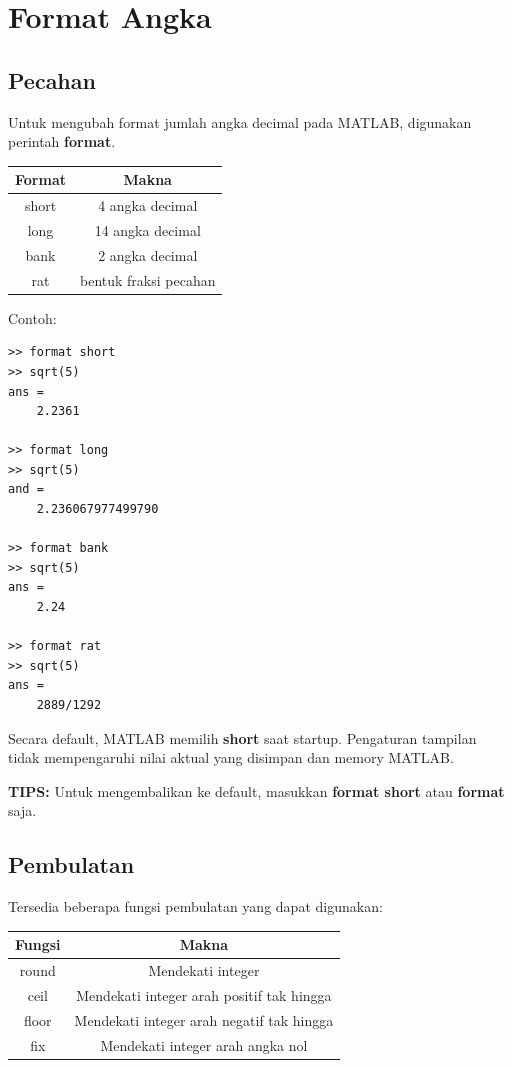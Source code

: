 \documentclass[12pt]{book}
\begin{document}
	\section{Format Angka}
	\subsection{Pecahan}

	Untuk mengubah format jumlah angka decimal pada MATLAB, digunakan perintah \textbf{format}.

	\begin{center}
		\begin{tabular}{|c|c|}
			\hline
			Format & Makna \\
			\hline\hline
			short & 4 angka decimal \\
			\hline
			long & 14 angka decimal \\
			\hline
			bank & 2 angka decimal \\
			\hline
			rat & bentuk fraksi pecahan \\
			\hline
		\end{tabular}
	\end{center}

	Contoh:
	\begin{verbatim}
>> format short
>> sqrt(5)
ans =
    2.2361

>> format long
>> sqrt(5)
and =
    2.236067977499790

>> format bank
>> sqrt(5)
ans =
    2.24

>> format rat
>> sqrt(5)
ans =
    2889/1292
	\end{verbatim}

    Secara default, MATLAB memilih \textbf{short} saat startup.
    Pengaturan tampilan tidak mempengaruhi nilai aktual yang disimpan dan memory MATLAB.

    \textbf{TIPS:} Untuk mengembalikan ke default, masukkan \textbf{format short} atau \textbf{format} saja.

    \subsection{Pembulatan}

    Tersedia beberapa fungsi pembulatan yang dapat digunakan:

    \begin{center}
    	\begin{tabular}{|c|c|}
    		\hline
    		Fungsi & Makna \\
    		\hline\hline
    		round & Mendekati integer\\
    		\hline
    		ceil & Mendekati integer arah positif tak hingga \\
    		\hline
    		floor & Mendekati integer arah negatif tak hingga \\
    		\hline
    		fix & Mendekati integer arah angka nol \\
    		\hline
    	\end{tabular}
    \end{center}
\end{document}
